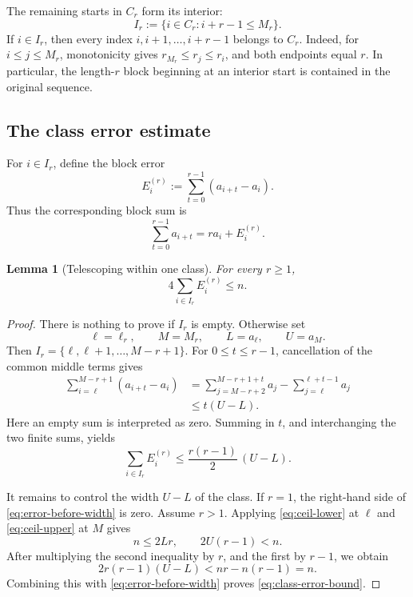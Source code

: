 \documentclass[11pt]{article}
\numberwithin{equation}{section}
\newtheorem{lemma}[theorem]{Lemma}
\theoremstyle{remark}
\begin{document}
The remaining starts in \(C_r\) form its interior:
\[
  I_r:=\{i\in C_r:i+r-1\leq M_r\}.
\]
If \(i\in I_r\), then every index \(i,i+1,\ldots,i+r-1\)
belongs to \(C_r\).  Indeed, for \(i\leq j\leq M_r\), monotonicity
gives \(r_{M_r}\leq r_j\leq r_i\), and both endpoints equal \(r\).
In particular, the length-\(r\) block beginning at an interior start
is contained in the original sequence.

\subsection{The class error estimate}

For \(i\in I_r\), define the block error
\begin{equation}
  E_i^{(r)}
  :=\sum_{t=0}^{r-1}(a_{i+t}-a_i).
  \label{eq:error}
\end{equation}
Thus the corresponding block sum is
\begin{equation}
  \sum_{t=0}^{r-1}a_{i+t}
  =r a_i+E_i^{(r)}.
  \label{eq:block-decomposition}
\end{equation}

\begin{lemma}[Telescoping within one class]
\label{lem:class-error}
For every \(r\geq1\),
\begin{equation}
  4\sum_{i\in I_r}E_i^{(r)}\leq n.
  \label{eq:class-error-bound}
\end{equation}
\end{lemma}

\begin{proof}
There is nothing to prove if \(I_r\) is empty.  Otherwise set
\[
  \ell=\ell_r,\qquad M=M_r,\qquad
  L=a_\ell,\qquad U=a_M.
\]
Then \(I_r=\{\ell,\ell+1,\ldots,M-r+1\}\).
For \(0\leq t\leq r-1\), cancellation of the common middle terms
gives
\begin{align*}
  \sum_{i=\ell}^{M-r+1}(a_{i+t}-a_i)
  &=
  \sum_{j=M-r+2}^{M-r+1+t}a_j
  -\sum_{j=\ell}^{\ell+t-1}a_j\\
  &\leq t(U-L).
\end{align*}
Here an empty sum is interpreted as zero.  Summing in \(t\), and
interchanging the two finite sums, yields
\begin{equation}
  \sum_{i\in I_r}E_i^{(r)}
  \leq \frac{r(r-1)}2\,(U-L).
  \label{eq:error-before-width}
\end{equation}

It remains to control the width \(U-L\) of the class.  If \(r=1\),
the right-hand side of \eqref{eq:error-before-width} is zero.  Assume
\(r>1\).  Applying \eqref{eq:ceil-lower} at \(\ell\) and
\eqref{eq:ceil-upper} at \(M\) gives
\[
  n\leq2Lr,\qquad 2U(r-1)<n.
\]
After multiplying the second inequality by \(r\), and the first by
\(r-1\), we obtain
\[
  2r(r-1)(U-L)<nr-n(r-1)=n.
\]
Combining this with \eqref{eq:error-before-width} proves
\eqref{eq:class-error-bound}.
\end{proof}
\end{document}
